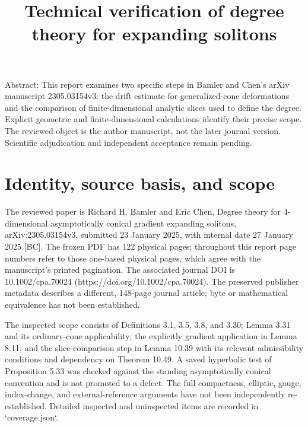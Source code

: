 \documentclass[10pt]{article}
\title{Technical verification of
degree theory for expanding solitons}
\author{}
\date{}
\begin{document}
\maketitle
Abstract: This report examines two specific steps in Bamler and Chen’s arXiv manuscript 2305.03154v3: the drift estimate for generalized-cone deformations and the comparison of finite-dimensional analytic slices used to define the degree. Explicit geometric and finite-dimensional calculations identify their precise scope. The reviewed object is the author manuscript, not the later journal version. Scientific adjudication and independent acceptance remain pending.\par
\section*{Identity, source basis, and scope}
The reviewed paper is Richard H. Bamler and Eric Chen, Degree theory for 4-dimensional asymptotically conical gradient expanding solitons, arXiv:2305.03154v3, submitted 23 January 2025, with internal date 27 January 2025 [BC]. The frozen PDF has 122 physical pages; throughout this report page numbers refer to those one-based physical pages, which agree with the manuscript’s printed pagination. The associated journal DOI is 10.1002/cpa.70024 (https://doi.org/10.1002/cpa.70024). The preserved publisher metadata describes a different, 148-page journal article; byte or mathematical equivalence has not been established.\par
The inspected scope consists of Definitions 3.1, 3.5, 3.8, and 3.30; Lemma 3.31 and its ordinary-cone applicability; the explicitly gradient application in Lemma 8.11; and the slice-comparison step in Lemma 10.39 with its relevant admissibility conditions and dependency on Theorem 10.49. A saved hyperbolic test of Proposition 5.33 was checked against the standing asymptotically conical convention and is not promoted to a defect. The full compactness, elliptic, gauge, index-change, and external-reference arguments have not been independently re-established. Detailed inspected and uninspected items are recorded in `coverage.json`.\par
\end{document}
